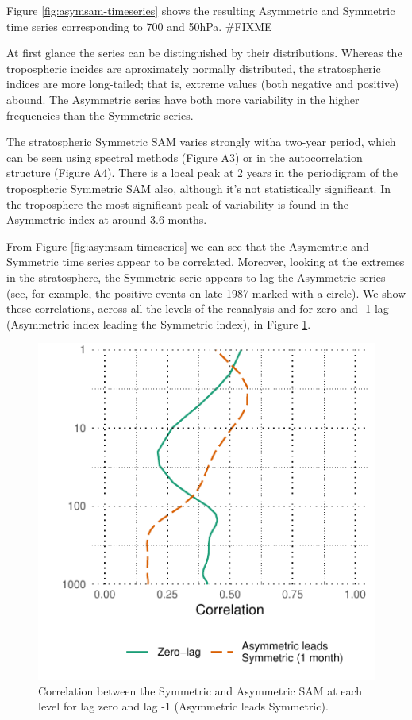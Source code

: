 \documentclass[]{ametsocV5}
\begin{document}
Figure \ref{fig:asymsam-timeseries} shows the resulting Asymmetric and
Symmetric time series corresponding to 700 and 50hPa. \#FIXME

At first glance the series can be distinguished by their distributions.
Whereas the tropospheric incides are aproximately normally distributed,
the stratospheric indices are more long-tailed; that is, extreme values
(both negative and positive) abound. The Asymmetric series have both
more variability in the higher frequencies than the Symmetric series.

The stratospheric Symmetric SAM varies strongly witha two-year period,
which can be seen using spectral methods (Figure A3) or in the
autocorrelation structure (Figure A4). There is a local peak at 2 years
in the periodigram of the tropospheric Symmetric SAM also, although it's
not statistically significant. In the troposphere the most significant
peak of variability is found in the Asymmetric index at around 3.6
months.

From Figure \ref{fig:asymsam-timeseries} we can see that the Asymemtric
and Symmetric time series appear to be correlated. Moreover, looking at
the extremes in the stratosphere, the Symmetric serie appears to lag the
Asymmetric series (see, for example, the positive events on late 1987
marked with a circle). We show these correlations, across all the levels
of the reanalysis and for zero and -1 lag (Asymmetric index leading the
Symmetric index), in Figure \ref{fig:cor-lev}.

\begin{figure}
\includegraphics{cor-lev-1} \caption[Correlation between the Symmetric and Asymmetric SAM at each level for lag zero and lag -1 (Asymmetric leads Symmetric)]{Correlation between the Symmetric and Asymmetric SAM at each level for lag zero and lag -1 (Asymmetric leads Symmetric).}\label{fig:cor-lev}
\end{figure}
\end{document}
